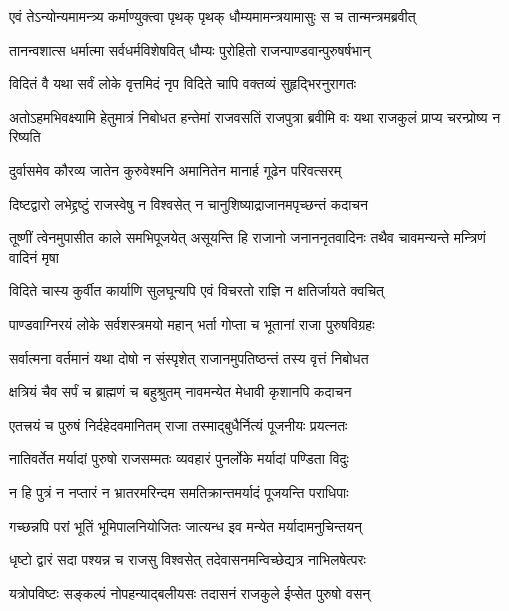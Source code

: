
\twolineshloka
{एवं तेऽन्योन्यमामन्त्र्य कर्माण्युक्त्वा पृथक् पृथक्}
{धौम्यमामन्त्रयामासुः स च तान्मन्त्रमब्रवीत्}


\twolineshloka
{तानन्वशात्स धर्मात्मा सर्वधर्मविशेषवित्}
{धौम्यः पुरोहितो राजन्पाण्डवान्पुरुषर्षभान्}




\twolineshloka
{विदितं वै यथा सर्वं लोके वृत्तमिदं नृप}
{विदिते चापि वक्तव्यं सुहृद्भिरनुरागतः}


\threelineshloka
{अतोऽहमभिवक्ष्यामि हेतुमात्रं निबोधत}
{हन्तेमां राजवसतिं राजपुत्रा ब्रवीमि वः}
{यथा राजकुलं प्राप्य चरन्प्रोष्य न रिष्यति}


\twolineshloka
{दुर्वासमेव कौरव्य जातेन कुरुवेश्मनि}
{अमानितेन मानार्ह गूढेन परिवत्सरम्}


\twolineshloka
{दिष्टद्वारो लभेद्द्रष्टुं राजस्वेषु न विश्वसेत्}
{न चानुशिष्याद्राजानमपृच्छन्तं कदाचन}


\onelineshloka
{तूष्णीं त्वेनमुपासीत काले समभिपूजयेत्}
\twolineshloka
{असूयन्ति हि राजानो जनाननृतवादिनः}
{तथैव चावमन्यन्ते मन्त्रिणं वादिनं मृषा}


\twolineshloka
{विदिते चास्य कुर्वीत कार्याणि सुलघून्यपि}
{एवं विचरतो राज्ञि न क्षतिर्जायते क्वचित्}


\twolineshloka
{पाण्डवाग्निरयं लोके सर्वशस्त्रमयो महान्}
{भर्ता गोप्ता च भूतानां राजा पुरुषविग्रहः}


\twolineshloka
{सर्वात्मना वर्तमानं यथा दोषो न संस्पृशेत्}
{राजानमुपतिष्ठन्तं तस्य वृत्तं निबोधत}


\twolineshloka
{क्षत्रियं चैव सर्पं च ब्राह्मणं च बहुश्रुतम्}
{नावमन्येत मेधावी कृशानपि कदाचन}


\twolineshloka
{एतत्त्रयं च पुरुषं निर्दहेदवमानितम्}
{राजा तस्माद्बुधैर्नित्यं पूजनीयः प्रयत्नतः}


\twolineshloka
{नातिवर्तेत मर्यादां पुरुषो राजसम्मतः}
{व्यवहारं पुनर्लोके मर्यादां पण्डिता विदुः}


\twolineshloka
{न हि पुत्रं न नप्तारं न भ्रातरमरिन्दम}
{समतिक्रान्तमर्यादं पूजयन्ति पराधिपाः}


\twolineshloka
{गच्छन्नपि परां भूतिं भूमिपालनियोजितः}
{जात्यन्ध इव मन्येत मर्यादामनुचिन्तयन्}


\twolineshloka
{धृष्टो द्वारं सदा पश्यन्न च राजसु विश्वसेत्}
{तदेवासनमन्विच्छेद्यत्र नाभिलषेत्परः}


\twolineshloka
{यत्रोपविष्टः सङ्कल्पं नोपहन्याद्बलीयसः}
{तदासनं राजकुले ईप्सेत पुरुषो वसन्}


